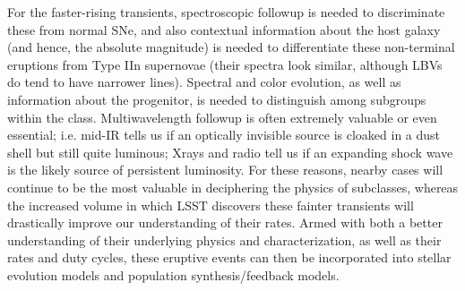 For the faster-rising transients, spectroscopic followup is needed to
discriminate these from normal SNe, and also contextual information
about the host galaxy (and hence, the absolute magnitude) is needed to
differentiate these non-terminal eruptions from Type IIn supernovae
(their spectra look similar, although LBVs do tend to have narrower
lines).  Spectral and color evolution, as well as information about
the progenitor, is needed to distinguish among subgroups within the
class.  Multiwavelength followup is often extremely valuable or even
essential; i.e. mid-IR tells us if an optically invisible source is
cloaked in a dust shell but still quite luminous; Xrays and radio tell
us if an expanding shock wave is the likely source of persistent
luminosity.  For these reasons, nearby cases will continue to be the
most valuable in deciphering the physics of subclasses, whereas the
increased volume in which LSST discovers these fainter transients will
drastically improve our understanding of their rates.  Armed with both
a better understanding of their underlying physics and
characterization, as well as their rates and duty cycles, these
eruptive events can then be incorporated into stellar evolution models
and population synthesis/feedback models.

%
%
%
%
%
%
%

